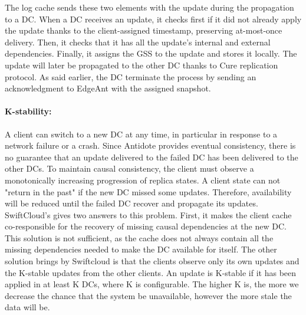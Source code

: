 \documentclass[11pt]{article}
\newcommand\bulletitem{\item[$\bullet$]}
\begin{document}
The log cache sends these two elements with the update during the propagation
to a DC. When a DC receives an update, it checks first if it did not already
apply the update thanks to the client-assigned timestamp, preserving
at-most-once delivery. Then, it checks that it has all the update's internal
and external dependencies. Finally, it assigns the GSS to the update and
stores it locally. The update will later be propagated to the other DC thanks
to Cure replication protocol. As said earlier, the DC terminate the process by
sending an acknowledgment to EdgeAnt with the assigned snapshot.


\paragraph{K-stability:}
A client can switch to a new DC at any time, in particular in response to a
network failure or a crash. Since Antidote provides eventual consistency,
there is no guarantee that an update delivered to the failed DC has been
delivered to the other DCs. To maintain causal consistency, the client must
observe a monotonically increasing progression of replica states. A client
state can not "return in the past" if the new DC missed some updates.
Therefore, availability will be reduced until the failed DC recover and
propagate its updates. SwiftCloud's gives two answers to this problem. First,
it makes the client cache co-responsible for the recovery of missing causal
dependencies at the new DC. This solution is not sufficient, as the cache does
not always contain all the missing dependencies needed to make the DC
available for itself. The other solution brings by Swiftcloud is that the
clients observe only its own updates and the K-stable updates from the other
clients. An update is K-stable if it has been applied in at least K DCs, where
K is configurable. The higher K is, the more we decrease the chance that the
system be unavailable, however the more stale the data will be.



\end{document}

